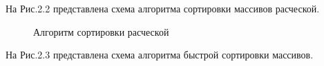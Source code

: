 \documentclass[a4paper,12pt]{report}
\begin{document}
На Рис.2.2 представлена схема алгоритма сортировки массивов расческой.
\begin{figure}[ht!]
\caption{Алгоритм сортировки расческой}
\end{figure}
\newpage

На Рис.2.3 представлена схема алгоритма быстрой сортировки массивов.
\end{document}
